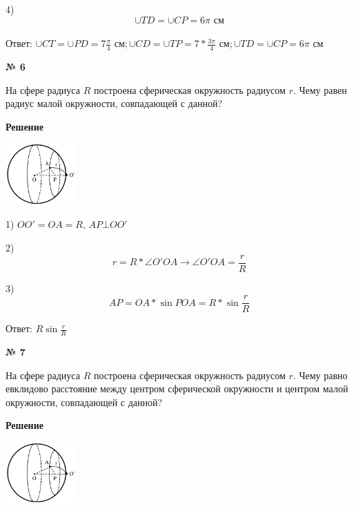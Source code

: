     4) \[
           \cup TD = \cup CP = 6\pi \text{ см}
    \]\\

    Ответ: $\cup CT = \cup PD = 7\frac{\pi}{4} \text{ см}; \cup CD = \cup TP = 7*\frac{3\pi}{4}\text{ см}; \cup TD = \cup CP = 6\pi \text{ см}$

    \begin{center}
        \textbf{№ 6}
    \end{center}

    На сфере радиуса $R$ построена сферическая окружность радиусом $r$.
    Чему равен радиус малой окружности, совпадающей с данной?

    \textbf{Решение}\\

    \begin{center}
        \includegraphics[width=0.2\textwidth]{images/img9}\\
    \end{center}

    1) $OO' = OA = R$, $AP \bot OO'$

    2)
    \[
        r = R*\angle O'OA \rightarrow \angle O'OA = \frac{r}{R}
    \]

    3)
    \[
        AP = OA * \sin POA = R * \sin \frac{r}{R}
    \]

    Ответ: $R\sin \frac{r}{R}$

    \begin{center}
        \textbf{№ 7}
    \end{center}

    На сфере радиуса $R$ построена сферическая окружность радиусом $r$.
    Чему равно евклидово расстояние между центром сферической окружности и центром малой окружности,
    совпадающей с данной?

     \textbf{Решение}\\

    \begin{center}
        \includegraphics[width=0.2\textwidth]{images/img10}\\
    \end{center}


